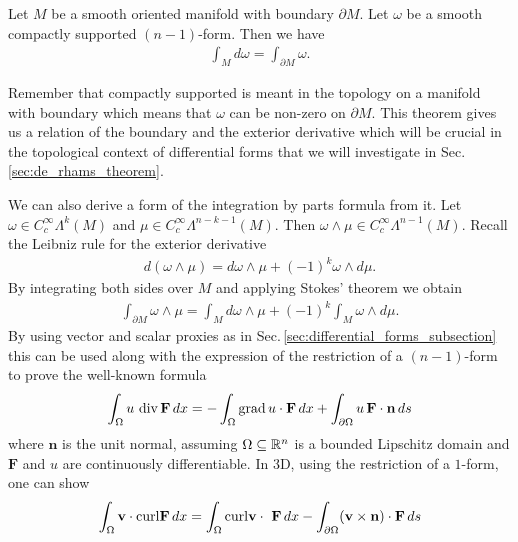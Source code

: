 \documentclass[../master_thesis.tex]{subfiles}
\begin{document}
\begin{theorem}[Stokes]
    Let $M$ be a smooth oriented manifold with boundary 
    $\partial M$. Let $\omega$ be 
    a smooth compactly supported $(n-1)$-form. Then we have 
    \begin{align*}
        \int_M d\omega = \int_{\partial M} \omega.
    \end{align*}
\end{theorem}
Remember that compactly supported is meant in the topology on a manifold with 
boundary which means that $\omega$ can be non-zero on $\partial M$.
This theorem gives us a relation of the boundary and the exterior derivative 
which will be crucial in the topological context of differential forms 
that we will investigate in Sec.\,\ref{sec:de_rhams_theorem}. 

We can also derive a form of the integration by parts formula from it. 
Let $\omega \in C_c^\infty \Lambda^k (M)$ and $\mu \in C_c^\infty \Lambda^{n-k-1}(M)$. 
Then $\omega \wedge \mu \in C_c^\infty \Lambda^{n-1} (M)$. Recall the 
Leibniz rule for the exterior derivative 
\begin{align*}
    d(\omega \wedge \mu) = d\omega \wedge \mu + (-1)^k \omega \wedge d\mu. 
\end{align*}
By integrating both sides over $M$ and applying Stokes' theorem we obtain
\begin{align*}
    \int_{\partial M} \omega \wedge \mu 
    = \int_M d\omega \wedge \mu + (-1)^k \int_M \omega \wedge d\mu.
\end{align*}
By using vector and scalar proxies as in Sec.\,\ref{sec:differential_forms_subsection}
this can be used along with the expression of the restriction of a $(n-1)$-form to 
prove the well-known formula
\begin{align*}
    \int_\Omega u\,\operatorname{div} \mathbf{F} \, dx 
    =  - \int_\Omega \operatorname{grad} u \cdot \mathbf{F} \, dx + 
        \int_{\partial \Omega } u \, \mathbf{F}\cdot \mathbf{n} \, ds
\end{align*}
where $\mathbf{n}$ is the unit normal, assuming $\Omega \subseteq \mathbb{R}^n$ is a bounded Lipschitz domain
and $\mathbf{F}$ and $u$ are continuously differentiable.
In 3D, using the restriction of a $1$-form, one can show
\begin{align*}
    \int_\Omega \mathbf{v} \cdot \mathbf{\operatorname{curl}} \mathbf{F} \, dx
    = \int_\Omega \mathbf{\operatorname{curl}} \mathbf{v} \cdot \ \mathbf{F} \, dx
        - \int_{\partial \Omega } (\mathbf{v} \times \mathbf{n})\cdot \mathbf{F} \, ds
\end{align*}
\end{document}
